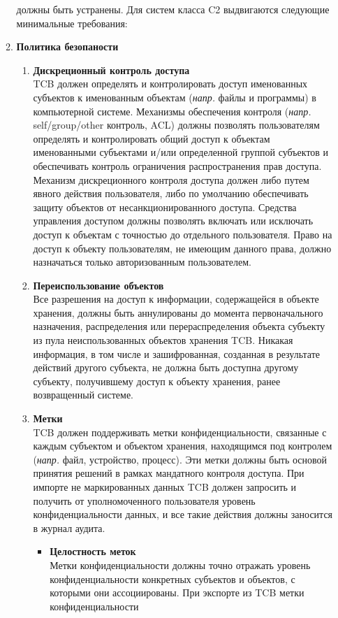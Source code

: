 \begin{enumerate}
\begin{enumerate}
		должны быть устранены. Для систем класса C2 выдвигаются следующие минимальные требования:
		\item{\textbf{Политика безопаности}}
		\begin{enumerate}
			\item{\textbf{Дискреционный контроль доступа}}\\
			TCB должен определять и контролировать доступ именованных субъектов к именованным объектам (\textit{напр.} файлы и программы) в компьютерной системе. Механизмы обеспечения контроля
			(\textit{напр.} self/group/other контроль, ACL) должны позволять пользователям определять и контролировать общий доступ к объектам именованными субъектами и/или определенной группой
			субъектов и обеспечивать контроль ограничения распространения прав доступа. Механизм дискреционного контроля доступа должен либо путем явного действия пользователя, либо по умолчанию
			обеспечивать защиту объектов от несанкционированного доступа. Средства управления доступом должны позволять включать или исключать доступ к объектам с точностью до отдельного
			пользователя. Право на доступ к объекту пользователям, не имеющим данного права, должно назначаться только авторизованным пользователем.
			\item{\textbf{Переиспользование объектов}}\\
			Все разрешения на доступ к информации, содержащейся в объекте хранения, должны быть аннулированы до момента первоначального назначения, распределения или перераспределения объекта
			субъекту из пула неиспользованных объектов хранения TCB. Никакая информация, в том числе и зашифрованная, созданная в результате действий другого субъекта, не должна быть доступна
			другому субъекту, получившему доступ к объекту хранения, ранее возвращенный системе.
			\item{\textbf{Метки}}\\
			TCB должен поддерживать метки конфиденциальности, связанные с каждым субъектом и объектом хранения, находящимся под контролем (\textit{напр.} файл, устройство, процесс). Эти метки должны
			быть основой принятия решений в рамках мандатного контроля доступа. При импорте не маркированных данных TCB должен запросить и получить от уполномоченного пользователя уровень
			конфиденциальности данных, и все такие действия должны заносится в журнал аудита.
			\begin{itemize}
				\item{\textbf{Целостность меток}}\\
				Метки конфиденциальности должны точно отражать уровень конфиденциальности конкретных субъектов и объектов, с которыми они ассоциированы. При экспорте из TCB метки конфиденциальности

\end{itemize}
\end{enumerate}
\end{enumerate}
\end{enumerate}
